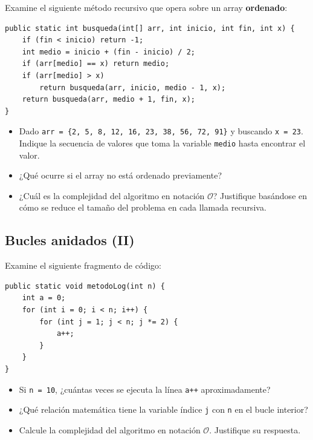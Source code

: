 \documentclass[a4paper]{article}
\newcommand{\code}[1]{\texttt{#1}}
\newcommand{\bigO}{\mathcal{O}}
\begin{document}
Examine el siguiente método recursivo que opera sobre un array \textbf{ordenado}:

\begin{verbatim}
public static int busqueda(int[] arr, int inicio, int fin, int x) {
    if (fin < inicio) return -1;
    int medio = inicio + (fin - inicio) / 2;
    if (arr[medio] == x) return medio;
    if (arr[medio] > x) 
        return busqueda(arr, inicio, medio - 1, x);
    return busqueda(arr, medio + 1, fin, x);
}
\end{verbatim}

\begin{itemize}
    \item Dado \code{arr = \{2, 5, 8, 12, 16, 23, 38, 56, 72, 91\}} y buscando \code{x = 23}. Indique la secuencia de valores que toma la variable \code{medio} hasta encontrar el valor.
    \item ¿Qué ocurre si el array no está ordenado previamente?
    \item ¿Cuál es la complejidad del algoritmo en notación $\bigO$? Justifique basándose en cómo se reduce el tamaño del problema en cada llamada recursiva.
\end{itemize}

\subsection{Bucles anidados (II)}

Examine el siguiente fragmento de código:

\begin{verbatim}
public static void metodoLog(int n) {
    int a = 0;
    for (int i = 0; i < n; i++) {
        for (int j = 1; j < n; j *= 2) {
            a++;
        }
    }
}
\end{verbatim}

\begin{itemize}
    \item Si \code{n = 10}, ¿cuántas veces se ejecuta la línea \code{a++} aproximadamente?
    \item ¿Qué relación matemática tiene la variable índice \code{j} con \code{n} en el bucle interior?
    \item Calcule la complejidad del algoritmo en notación $\bigO$. Justifique su respuesta.
\end{itemize}
\end{document}

